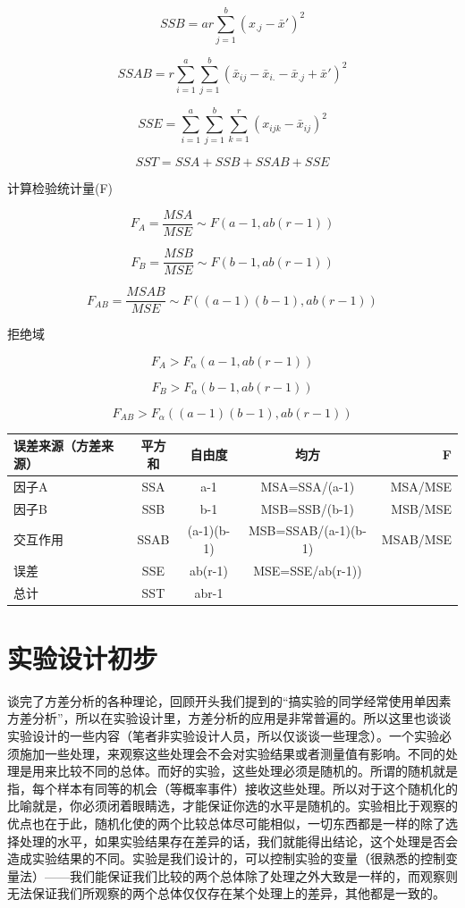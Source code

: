 \documentclass[]{ctexbook}
\begin{document}
\[SSB=ar\sum_{j=1}^b(x_{.j}-\bar x')^2\]

\[SSAB=r\sum_{i=1}^a\sum_{j=1}^b(\bar x_{ij}-\bar x_{i.}-\bar x_{.j}+\bar x')^2\]

\[SSE=\sum_{i=1}^a\sum_{j=1}^b\sum_{k=1}^r(x_{ijk}-\bar x_{ij})^2\]

\[SST=SSA+SSB+SSAB+SSE\]

计算检验统计量(F)

\[F_A=\frac{MSA}{MSE}\sim F(a-1,ab(r-1))\]

\[F_B=\frac{MSB}{MSE}\sim F(b-1,ab(r-1))\]

\[F_{AB}=\frac{MSAB}{MSE}\sim F((a-1)(b-1),ab(r-1))\]

拒绝域

\[F_A> F_\alpha(a-1,ab(r-1))\]

\[F_B> F_\alpha(b-1,ab(r-1))\]

\[F_{AB}> F_\alpha((a-1)(b-1),ab(r-1))\]

\begin{longtable}[]{@{}lcccr@{}}
\toprule
误差来源（方差来源） & 平方和 & 自由度 & 均方 & F\tabularnewline
\midrule
\endhead
因子A & SSA & a-1 & MSA=SSA/(a-1) & MSA/MSE\tabularnewline
因子B & SSB & b-1 & MSB=SSB/(b-1) & MSB/MSE\tabularnewline
交互作用 & SSAB & (a-1)(b-1) & MSB=SSAB/(a-1)(b-1) & MSAB/MSE\tabularnewline
误差 & SSE & ab(r-1) & MSE=SSE/ab(r-1)) &\tabularnewline
总计 & SST & abr-1 & &\tabularnewline
\bottomrule
\end{longtable}

\hypertarget{ux5b9eux9a8cux8bbeux8ba1ux521dux6b65}{%
\section{实验设计初步}\label{ux5b9eux9a8cux8bbeux8ba1ux521dux6b65}}

谈完了方差分析的各种理论，回顾开头我们提到的``搞实验的同学经常使用单因素方差分析''，所以在实验设计里，方差分析的应用是非常普遍的。所以这里也谈谈实验设计的一些内容（笔者非实验设计人员，所以仅谈谈一些理念）。一个实验必须施加一些处理，来观察这些处理会不会对实验结果或者测量值有影响。不同的处理是用来比较不同的总体。而好的实验，这些处理必须是随机的。所谓的随机就是指，每个样本有同等的机会（等概率事件）接收这些处理。所以对于这个随机化的比喻就是，你必须闭着眼睛选，才能保证你选的水平是随机的。实验相比于观察的优点也在于此，随机化使的两个比较总体尽可能相似，一切东西都是一样的除了选择处理的水平，如果实验结果存在差异的话，我们就能得出结论，这个处理是否会造成实验结果的不同。实验是我们设计的，可以控制实验的变量（很熟悉的控制变量法）------我们能保证我们比较的两个总体除了处理之外大致是一样的，而观察则无法保证我们所观察的两个总体仅仅存在某个处理上的差异，其他都是一致的。
\end{document}
